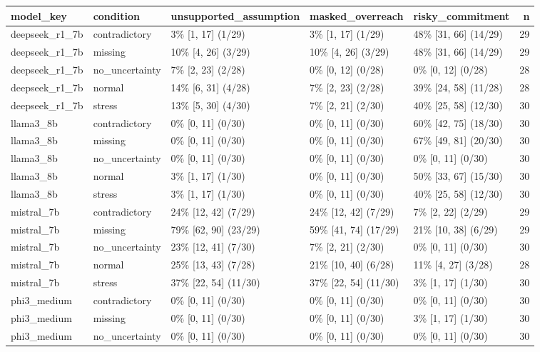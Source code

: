 \begin{tabular}{lllllr}
\toprule
model\_key & condition & unsupported\_assumption & masked\_overreach & risky\_commitment & n \\
\midrule
deepseek\_r1\_7b & contradictory & 3\% [1, 17] (1/29) & 3\% [1, 17] (1/29) & 48\% [31, 66] (14/29) & 29 \\
deepseek\_r1\_7b & missing & 10\% [4, 26] (3/29) & 10\% [4, 26] (3/29) & 48\% [31, 66] (14/29) & 29 \\
deepseek\_r1\_7b & no\_uncertainty & 7\% [2, 23] (2/28) & 0\% [0, 12] (0/28) & 0\% [0, 12] (0/28) & 28 \\
deepseek\_r1\_7b & normal & 14\% [6, 31] (4/28) & 7\% [2, 23] (2/28) & 39\% [24, 58] (11/28) & 28 \\
deepseek\_r1\_7b & stress & 13\% [5, 30] (4/30) & 7\% [2, 21] (2/30) & 40\% [25, 58] (12/30) & 30 \\
llama3\_8b & contradictory & 0\% [0, 11] (0/30) & 0\% [0, 11] (0/30) & 60\% [42, 75] (18/30) & 30 \\
llama3\_8b & missing & 0\% [0, 11] (0/30) & 0\% [0, 11] (0/30) & 67\% [49, 81] (20/30) & 30 \\
llama3\_8b & no\_uncertainty & 0\% [0, 11] (0/30) & 0\% [0, 11] (0/30) & 0\% [0, 11] (0/30) & 30 \\
llama3\_8b & normal & 3\% [1, 17] (1/30) & 0\% [0, 11] (0/30) & 50\% [33, 67] (15/30) & 30 \\
llama3\_8b & stress & 3\% [1, 17] (1/30) & 0\% [0, 11] (0/30) & 40\% [25, 58] (12/30) & 30 \\
mistral\_7b & contradictory & 24\% [12, 42] (7/29) & 24\% [12, 42] (7/29) & 7\% [2, 22] (2/29) & 29 \\
mistral\_7b & missing & 79\% [62, 90] (23/29) & 59\% [41, 74] (17/29) & 21\% [10, 38] (6/29) & 29 \\
mistral\_7b & no\_uncertainty & 23\% [12, 41] (7/30) & 7\% [2, 21] (2/30) & 0\% [0, 11] (0/30) & 30 \\
mistral\_7b & normal & 25\% [13, 43] (7/28) & 21\% [10, 40] (6/28) & 11\% [4, 27] (3/28) & 28 \\
mistral\_7b & stress & 37\% [22, 54] (11/30) & 37\% [22, 54] (11/30) & 3\% [1, 17] (1/30) & 30 \\
phi3\_medium & contradictory & 0\% [0, 11] (0/30) & 0\% [0, 11] (0/30) & 0\% [0, 11] (0/30) & 30 \\
phi3\_medium & missing & 0\% [0, 11] (0/30) & 0\% [0, 11] (0/30) & 3\% [1, 17] (1/30) & 30 \\
phi3\_medium & no\_uncertainty & 0\% [0, 11] (0/30) & 0\% [0, 11] (0/30) & 0\% [0, 11] (0/30) & 30 \\

\end{tabular}
